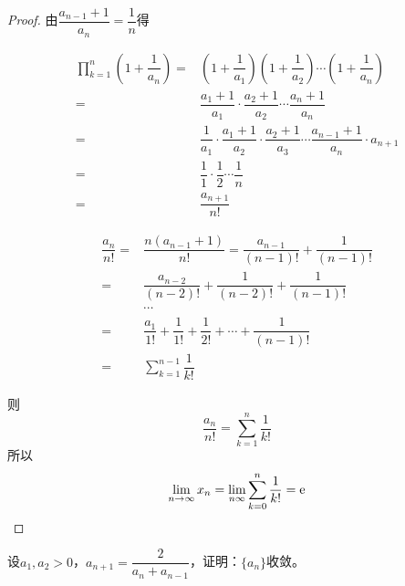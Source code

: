 \begin{proof}

    由$\dfrac{a_{n - 1}+1}{a_n} = \dfrac{1}{n}$得

    \begin{align*}
        \prod_{k  = 1}^{n}{\left(1+\dfrac{1}{a_n}\right)} = & \left(1+\dfrac{1}{a_1}\right) \left(1 + \dfrac{1}{a_2}\right) \cdots \left(1+\dfrac{1}{a_n}\right) \\
        = & \dfrac{a_1 + 1}{a_1} \cdot \dfrac{a_2 + 1}{a_2} \cdots \dfrac{a_n + 1}{a_n} \\
        = & \dfrac{1}{a_1} \cdot \dfrac{a_1 + 1}{a_2} \cdot \dfrac{a_2 + 1}{a_3} \cdots \dfrac{a_{n - 1} + 1}{a_n} \cdot a_{n + 1} \\
        = & \dfrac{1}{1} \cdot \dfrac{1}{2} \cdots \dfrac{1}{n} \\
        = & \dfrac{a_{n + 1}}{n!} 
    \end{align*}

    \begin{align*}
        \dfrac{a_n}{n!} = & \dfrac{n(a_{n - 1} + 1)}{n!} = \dfrac{a_{n - 1}}{(n - 1)!} + \dfrac{1}{(n - 1)!} \\
        = & \dfrac{a_{n - 2}}{(n - 2)!} + \dfrac{1}{(n - 2)!} + \dfrac{1}{(n - 1)!} \\
        & \cdots \\ 
        = & \dfrac{a_1}{1!} + \dfrac{1}{1!} + \dfrac{1}{2!} + \cdots + \dfrac{1}{(n - 1)!} \\
        = & \sum\limits_{k  = 1}^{n - 1}{\dfrac{1}{k!}} 
    \end{align*}

    则
    $$\dfrac{a_n}{n!} = \sum\limits_{k  = 1}^{n}{\dfrac{1}{k!}}$$
    所以
    $$\lim\limits_{n \to \infty}{x_n} = \lim\limits_{n\infty}{\sum\limits_{k = 0}^{n}{\dfrac{1}{k!}}} = \mathrm{e}$$

\end{proof}

\begin{proposition}

    设$a_1,a_2>0$，$a_{n + 1} = \dfrac{2}{a_n + a_{n - 1}}$，证明：$\{a_n\}$收敛。

\end{proposition}

